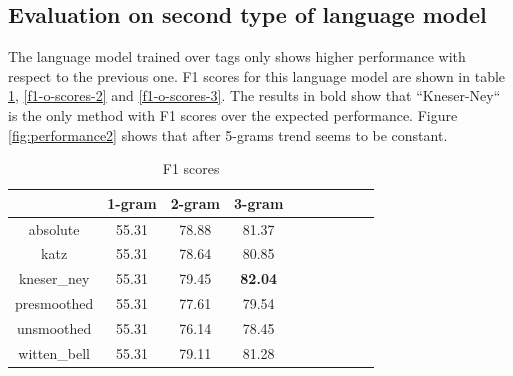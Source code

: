 \documentclass[11pt,a4paper]{article}
\begin{document}
\subsection*{Evaluation on second type of language model}
The language model trained over tags only shows higher performance with respect to the previous one. F1 scores for this language model are shown in table \ref{f1-o-scores-1}, \ref{f1-o-scores-2} and \ref{f1-o-scores-3}. The results in bold show that ``Kneser-Ney`` is the only method with F1 scores over the expected performance. Figure \ref{fig:performance2} shows that after 5-grams trend seems to be constant. 

\begin{table}[ht]
\centering
\begin{tabular}{|c|c|c|c|c|c|c|c|c|c|}
\hline
             & 1-gram & 2-gram & 3-gram  \\ \hline
absolute     & 55.31  & 78.88  & 81.37  \\ \hline
katz         & 55.31  & 78.64  & 80.85   \\ \hline
kneser\_ney  & 55.31  & 79.45  & \textbf{82.04} \\ \hline
presmoothed  & 55.31  & 77.61  & 79.54  \\ \hline
unsmoothed   & 55.31  & 76.14  & 78.45   \\ \hline
witten\_bell & 55.31  & 79.11  & 81.28  \\ \hline
\end{tabular}
\caption{F1 scores}
\label{f1-o-scores-1}
\end{table}
\end{document}
